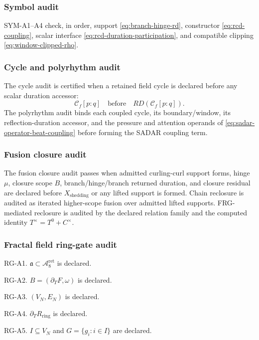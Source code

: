 \subsubsection{Symbol audit}\label{subsec:symbol-audit}
SYM-A1--A4 check, in order, support \eqref{eq:branch-hinge-rd}, constructor
\eqref{eq:rcd-coupling}, scalar interface \eqref{eq:rcd-duration-participation},
and compatible clipping \eqref{eq:window-clipped-rho}.

\subsubsection{Cycle and polyrhythm audit}\label{subsec:cycle-polyrhythm-audit}
The cycle audit is certified when a retained field cycle is declared before any scalar duration accessor:
\[
\mathcal C_f[p{:}q]
\quad\text{before}\quad
RD\!\left(\mathcal C_f[p{:}q]\right).
\]
The polyrhythm audit binds each coupled cycle, its boundary/window,
its reflection-duration accessor, and the pressure and attention operands
of \eqref{eq:sadar-operator-beat-coupling} before forming the SADAR coupling term.


\subsubsection{Fusion closure audit}\label{subsec:fusion-closure-audit}
The fusion closure audit passes when admitted curling-curl support forms, hinge \(\mu\), closure scope \(B\), branch/hinge/branch returned duration, and closure residual are declared before \(X_{\mathrm{shedding}}\) or any lifted support is formed. Chain reclosure is audited as iterated higher-scope fusion over admitted lifted supports. FRG-mediated reclosure is audited by the declared relation family and the computed identity \(T^\times=T^0+C^\times\).

\subsubsection{Fractal field ring-gate audit}\label{subsec:fractal-field-ring-gate-audit}
RG-A1. \(\mathfrak a\subset \mathcal A^{\mathrm{ret}}_8\) is declared.

RG-A2. \(B=(\partial_TF,\omega)\) is declared.

RG-A3. \((V_N,E_N)\) is declared.

RG-A4. \(\partial_T R_{\mathrm{ring}}\) is declared.

RG-A5. \(I\subseteq V_N\) and \(G=\{g_i:i\in I\}\) are declared.

